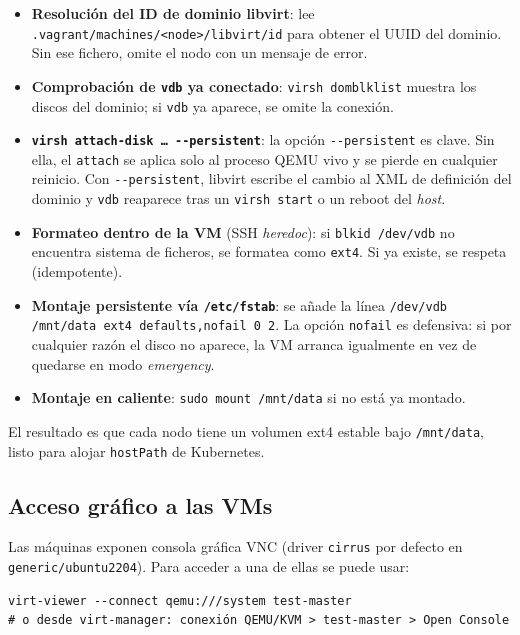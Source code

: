 \begin{itemize}
  \item \textbf{Resolución del ID de dominio libvirt}: lee \texttt{.vagrant/machines/<node>/libvirt/id} para obtener el UUID del dominio. Sin ese fichero, omite el nodo con un mensaje de error.

  \item \textbf{Comprobación de \texttt{vdb} ya conectado}: \texttt{virsh domblklist} muestra los discos del dominio; si \texttt{vdb} ya aparece, se omite la conexión.

  \item \textbf{\texttt{virsh attach-disk \dots\ -{}-persistent}}: la opción \texttt{-{}-persistent} es clave. Sin ella, el \texttt{attach} se aplica solo al proceso QEMU vivo y se pierde en cualquier reinicio. Con \texttt{-{}-persistent}, libvirt escribe el cambio al XML de definición del dominio y \texttt{vdb} reaparece tras un \texttt{virsh start} o un reboot del \emph{host}.

  \item \textbf{Formateo dentro de la VM} (SSH \emph{heredoc}): si \texttt{blkid /dev/vdb} no encuentra sistema de ficheros, se formatea como \texttt{ext4}. Si ya existe, se respeta (idempotente).

  \item \textbf{Montaje persistente vía \texttt{/etc/fstab}}: se añade la línea \texttt{/dev/vdb /mnt/data ext4 defaults,nofail 0 2}. La opción \texttt{nofail} es defensiva: si por cualquier razón el disco no aparece, la VM arranca igualmente en vez de quedarse en modo \emph{emergency}.

  \item \textbf{Montaje en caliente}: \texttt{sudo mount /mnt/data} si no está ya montado.
\end{itemize}

El resultado es que cada nodo tiene un volumen ext4 estable bajo \texttt{/mnt/data}, listo para alojar \texttt{hostPath} de Kubernetes.

\subsection{Acceso gráfico a las VMs}

Las máquinas exponen consola gráfica VNC (driver \texttt{cirrus} por defecto en \texttt{generic/ubuntu2204}). Para acceder a una de ellas se puede usar:

\begin{lstlisting}[style=bash]
virt-viewer --connect qemu:///system test-master
# o desde virt-manager: conexión QEMU/KVM > test-master > Open Console
\end{lstlisting}


